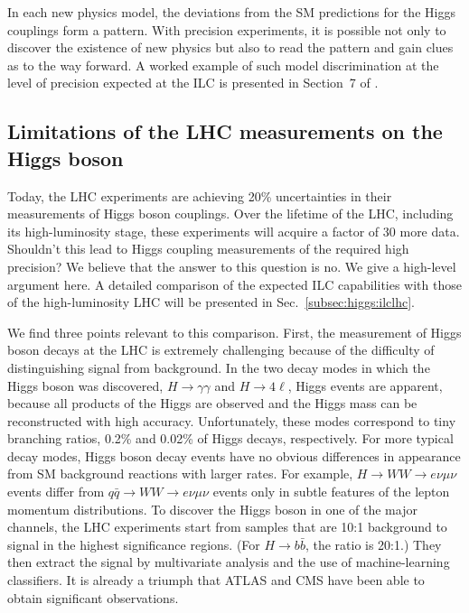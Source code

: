 In each new physics model, the  deviations from the SM predictions for the Higgs couplings form a pattern.  With precision experiments, it is possible not only to discover the existence of new physics but also to read the pattern and gain clues as to the way forward.   A worked example of such model discrimination at the level of precision expected at the ILC  is presented in
Section~7 of  \cite{Barklow:2017suo}.


\subsection{Limitations of the LHC measurements on the Higgs boson}

Today, the LHC experiments are achieving 20\% uncertainties in their measurements of Higgs boson couplings.   Over the lifetime of the LHC, including its high-luminosity stage, these experiments will acquire a factor of 30 more data.   Shouldn't this lead to Higgs coupling measurements of the required high precision?  We believe that the answer to this question is no.   We give a high-level argument here. A detailed comparison of the expected ILC capabilities with those of the high-luminosity LHC will be presented in Sec.~\ref{subsec:higgs:ilclhc}.

We find three points relevant to this comparison.  First, the measurement of Higgs boson 
decays at the LHC is extremely challenging because of the difficulty of distinguishing 
signal from background.
In the two decay modes in which the Higgs boson was discovered, $H\to \gamma\gamma$ and $H\to 4\ell$, Higgs events are apparent, because all products of the Higgs are observed and the Higgs mass can be reconstructed with high accuracy.  Unfortunately, these modes correspond to tiny branching ratios,  0.2\% and 0.02\% of Higgs decays, respectively.  For more typical decay  modes, Higgs boson decay events have no obvious differences in appearance from SM background reactions with larger rates.   For example, $H\to WW\to e\nu \mu \nu $ events differ from $q\bar q\to WW \to  e\nu \mu \nu $ events only in subtle features of the lepton momentum distributions.  To discover the Higgs boson in one of the major channels, the LHC experiments start from samples that are 10:1 background to signal in the highest significance regions.  (For $H\to b\bar b$, the ratio is 20:1.) They then  extract the signal by multivariate analysis and the use of machine-learning classifiers.  It is already a
 triumph that ATLAS and CMS have been able to obtain significant observations. 

